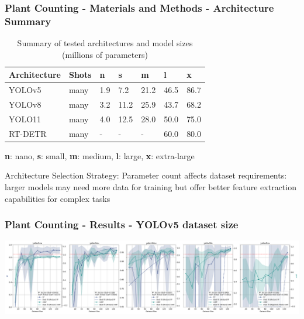 \documentclass[aspectratio=43]{beamer}
\begin{document}
\begin{frame}
    \frametitle{Plant Counting - Materials and Methods - Architecture Summary}
    
    \begin{table}[H]
        \scriptsize
        \caption{Summary of tested architectures and model sizes (millions of parameters)}
        \begin{tabularx}{\textwidth}{lXXXXXX}
        \toprule
        \textbf{Architecture} &\textbf{Shots} & \textbf{n} & \textbf{s} & \textbf{m} & \textbf{l} & \textbf{x} \\
        \midrule
        YOLOv5 & many & 1.9 & 7.2 & 21.2 & 46.5 & 86.7 \\
        YOLOv8 & many & 3.2 & 11.2 & 25.9 & 43.7 & 68.2 \\
        YOLO11 & many & 4.0 & 12.5 & 28.0 & 50.0 & 75.0 \\
        RT-DETR & many & - & - & - & 60.0 & 80.0 \\
        \bottomrule
        \end{tabularx}
    \end{table}
    
        \scriptsize
        \textbf{n}: nano, \textbf{s}: small, \textbf{m}: medium, \textbf{l}: large, \textbf{x}: extra-large

    
    \begin{alertblock}{Architecture Selection Strategy:}
        \small
        Parameter count affects dataset requirements: larger models may need more data for training but offer better feature extraction capabilities for complex tasks
    \end{alertblock}
\end{frame}

\begin{frame}
    \frametitle{Plant Counting - Results - YOLOv5 dataset size}
    \begin{center}
        \includegraphics[width=1\textwidth]{Imgs/r2_ap_vs_dataset_size_yolov5.pdf}
    \end{center}
\end{frame}
\end{document}
